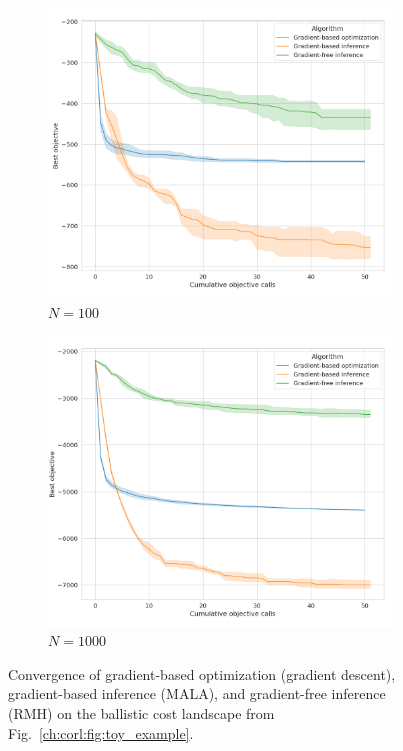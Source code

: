 {\begin{figure}[tb]
\begin{subfigure}[t]{0.24\linewidth}
    \end{subfigure}
    \begin{subfigure}[t]{0.24\linewidth}
        \centering
        \includegraphics[width=\linewidth]{images/global_methods/ballistic_100.png}
        \caption{$N=100$}
    \end{subfigure}
    \begin{subfigure}[t]{0.24\linewidth}
        \centering
        \includegraphics[width=\linewidth]{images/global_methods/ballistic_1000.png}
        \caption{$N=1000$}
    \end{subfigure}
    \caption{Convergence of gradient-based optimization (gradient descent), gradient-based inference (MALA), and gradient-free inference (RMH) on the ballistic cost landscape from Fig.~\ref{ch:corl:fig:toy_example}.}
    \label{ch:corl:fig:ballistic_convergence}
\end{figure}

}
